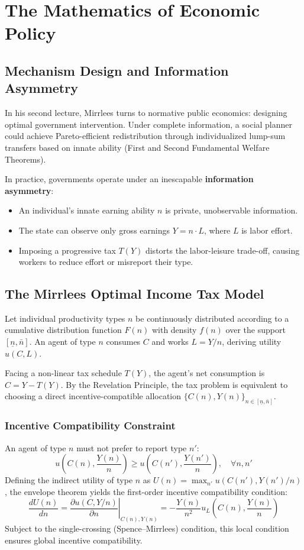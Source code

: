 \documentclass[11pt,a4paper]{article}
\begin{document}
\section{The Mathematics of Economic Policy}

\subsection{Mechanism Design and Information Asymmetry}
In his second lecture, Mirrlees turns to normative public economics: designing optimal government intervention. Under complete information, a social planner could achieve Pareto-efficient redistribution through individualized lump-sum transfers based on innate ability (First and Second Fundamental Welfare Theorems).

In practice, governments operate under an inescapable \textbf{information asymmetry}:
\begin{itemize}
    \item An individual's innate earning ability $n$ is private, unobservable information.
    \item The state can observe only gross earnings $Y = n \cdot L$, where $L$ is labor effort.
    \item Imposing a progressive tax $T(Y)$ distorts the labor-leisure trade-off, causing workers to reduce effort or misreport their type.
\end{itemize}

\subsection{The Mirrlees Optimal Income Tax Model}
Let individual productivity types $n$ be continuously distributed according to a cumulative distribution function $F(n)$ with density $f(n)$ over the support $[\underline{n}, \bar{n}]$. An agent of type $n$ consumes $C$ and works $L = Y / n$, deriving utility $u(C, L)$.

Facing a non-linear tax schedule $T(Y)$, the agent's net consumption is $C = Y - T(Y)$. By the Revelation Principle, the tax problem is equivalent to choosing a direct incentive-compatible allocation $\{C(n), Y(n)\}_{n \in [\underline{n}, \bar{n}]}$.

\subsubsection{Incentive Compatibility Constraint}
An agent of type $n$ must not prefer to report type $n'$:
\begin{equation}
u\left(C(n), \frac{Y(n)}{n}\right) \ge u\left(C(n'), \frac{Y(n')}{n}\right), \quad \forall n, n'
\end{equation}
Defining the indirect utility of type $n$ as $U(n) = \max_{n'} u(C(n'), Y(n')/n)$, the envelope theorem yields the first-order incentive compatibility condition:
\begin{equation}
\frac{dU(n)}{dn} = \left. \frac{\partial u(C, Y/n)}{\partial n} \right|_{C(n), Y(n)} = - \frac{Y(n)}{n^2} u_L\left(C(n), \frac{Y(n)}{n}\right)
\end{equation}
Subject to the single-crossing (Spence--Mirrlees) condition, this local condition ensures global incentive compatibility.
\end{document}
